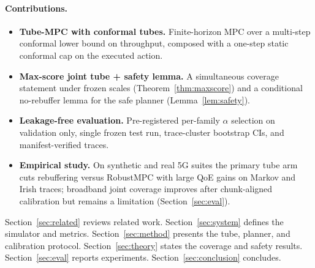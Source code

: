 \paragraph{Contributions.}
\begin{itemize}
  \item \textbf{Tube-MPC with conformal tubes.} Finite-horizon MPC over a multi-step conformal lower bound on throughput, composed with a one-step static conformal cap on the executed action.
  \item \textbf{Max-score joint tube + safety lemma.} A simultaneous coverage statement under frozen scales (Theorem~\ref{thm:maxscore}) and a conditional no-rebuffer lemma for the safe planner (Lemma~\ref{lem:safety}).
  \item \textbf{Leakage-free evaluation.} Pre-registered per-family \(\alpha\) selection on validation only, single frozen test run, trace-cluster bootstrap CIs, and manifest-verified traces.
  \item \textbf{Empirical study.} On synthetic and real \mbox{5G} suites the primary tube arm cuts rebuffering versus RobustMPC with large QoE gains on Markov and Irish traces; broadband joint coverage improves after chunk-aligned calibration but remains a limitation (Section~\ref{sec:eval}).
\end{itemize}

Section~\ref{sec:related} reviews related work.
Section~\ref{sec:system} defines the simulator and metrics.
Section~\ref{sec:method} presents the tube, planner, and calibration protocol.
Section~\ref{sec:theory} states the coverage and safety results.
Section~\ref{sec:eval} reports experiments.
Section~\ref{sec:conclusion} concludes.
